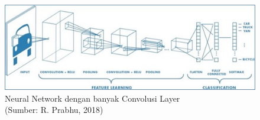 \begin{figure}[H]
	\vspace{-0.1cm}
	\begin{center}
		\includegraphics[width=1\columnwidth]{bab2/Gambar/Picture17.jpg}
	\end{center}
	\vspace{-0.2cm}
	\captionsetup{justification=centering}
	\caption{Neural Network dengan banyak Convolusi Layer\\(Sumber: R. Prabhu, 2018)}\label{img:Neural-Network-Dengan-Banyak-Convolusi-Layer}
\end{figure}

